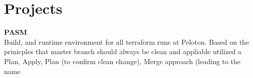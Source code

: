 \section{Projects}

\textbf{PASM} \\[3.75pt]
Build, and runtime environment for all terraform runs at Peloton. Based on the prinicples that master branch should always be clean and appliable utilized a Plan, Apply, Plan (to confirm clean change), Merge approach (leading to the name

